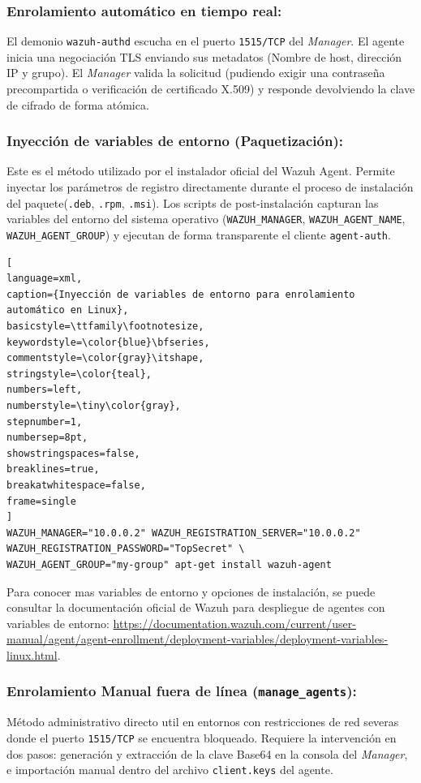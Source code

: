\subsubsection{Enrolamiento automático en tiempo real:}
El demonio \texttt{wazuh-authd} escucha en el puerto \texttt{1515/TCP} del \textit{Manager}. El agente inicia una negociación TLS enviando sus metadatos (Nombre de host, dirección IP y grupo). El \textit{Manager} valida la solicitud (pudiendo exigir una contraseña precompartida o verificación de certificado X.509) y responde devolviendo la clave de cifrado de forma atómica.

\subsubsection{Inyección de variables de entorno (Paquetización):}
Este es el método utilizado por el instalador oficial del Wazuh Agent. Permite inyectar los parámetros de registro directamente durante el proceso de instalación del paquete(\texttt{.deb}, \texttt{.rpm}, \texttt{.msi}). Los scripts de post-instalación capturan las variables del entorno del sistema operativo (\texttt{WAZUH\_MANAGER}, \texttt{WAZUH\_AGENT\_NAME}, \texttt{WAZUH\_AGENT\_GROUP}) y ejecutan de forma transparente el cliente \texttt{agent-auth}.

\begin{lstlisting}[
language=xml,
caption={Inyección de variables de entorno para enrolamiento automático en Linux},
basicstyle=\ttfamily\footnotesize,
keywordstyle=\color{blue}\bfseries,
commentstyle=\color{gray}\itshape,
stringstyle=\color{teal},
numbers=left,
numberstyle=\tiny\color{gray},
stepnumber=1,
numbersep=8pt,
showstringspaces=false,
breaklines=true,
breakatwhitespace=false,
frame=single
]
WAZUH_MANAGER="10.0.0.2" WAZUH_REGISTRATION_SERVER="10.0.0.2" WAZUH_REGISTRATION_PASSWORD="TopSecret" \
WAZUH_AGENT_GROUP="my-group" apt-get install wazuh-agent
\end{lstlisting}

Para conocer mas variables de entorno y opciones de instalación, se puede consultar la documentación oficial de Wazuh para despliegue de agentes con variables de entorno: \url{https://documentation.wazuh.com/current/user-manual/agent/agent-enrollment/deployment-variables/deployment-variables-linux.html}.

\subsubsection{Enrolamiento Manual fuera de línea (\texttt{manage\_agents}):}
Método administrativo directo util en entornos con restricciones de red severas donde el puerto \texttt{1515/TCP} se encuentra bloqueado. Requiere la intervención en dos pasos: generación y extracción de la clave Base64 en la consola del \textit{Manager}, e importación manual dentro del archivo \texttt{client.keys} del agente.

